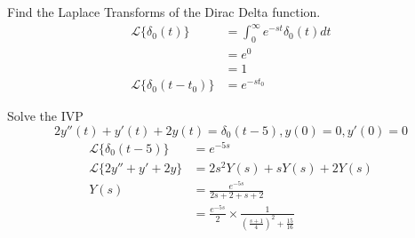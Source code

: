 \documentclass[12pt]{article}
\begin{document}
\begin{ex}
	Find the Laplace Transforms of the Dirac Delta function.
	\begin{align*}
		\mathcal{L}\{\delta_0(t)\} &= \int_0^\infty e^{-st}\delta_0(t)dt \\
					   &= e^0 \\
					   &= 1 \\
		\mathcal{L}\{\delta_0(t-t_0)\} &= e^{-st_0}
	\end{align*}
\end{ex}

\begin{ex}
	Solve the IVP
	$$2y''(t) + y'(t) + 2y(t) = \delta_0(t-5), y(0) = 0, y'(0) = 0$$
	\begin{align*}
		\mathcal{L}\{\delta_0(t-5)\} &= e^{-5s} \\
		\mathcal{L}\{2y'' + y' + 2y\} &= 2s^2Y(s) + sY(s) + 2Y(s) \\
		Y(s) &= \frac{e^{-5s}}{2s+2+s+2} \\
		     &= \frac{e^{-5s}}{2}\times\frac{1}{\left(\frac{s+1}{4}\right)^2 + \frac{15}{16}}
	\end{align*}
\end{ex}
\end{document}
